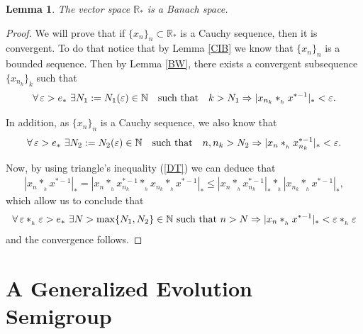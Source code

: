 \documentclass[10pt]{amsart}
\newtheorem{lemma}{Lemma}
\numberwithin{equation}{section}
\begin{document}
\begin{lemma}
The vector space $\mathbb{R}_*$ is a Banach space.
\end{lemma}

\begin{proof}
We will prove that if $\{x_{n}\}_{n}\subset \mathbb{R}_*$ is a Cauchy sequence, then it is convergent.
To do that notice that by Lemma \ref{CIB} we know that $\{x_{n}\}_{n}$ is a bounded sequence. Then by Lemma   
\ref{BW},  there exists a convergent
subsequence $\{x_{n_{k}}\}_{k}$ such that
\begin{equation*}
\forall \, \varepsilon >e_{\ast} \,\, \exists N_{1}:=N_{1}(\varepsilon)\in \mathbb{N} \quad\textnormal{such that} \quad
k>N_{1} \Rightarrow |x_{n_{k}}\ast_{_h} x^{\ast-1}|_{\ast}<\varepsilon.
\end{equation*}

In addition, as $\{x_{n}\}_{n}$ is a Cauchy sequence, we also know that
\begin{equation*}
\forall \, \varepsilon >e_{\ast} \,\, \exists N_{2}:=N_{2}(\varepsilon)\in \mathbb{N} \quad\textnormal{such that} \quad
n,n_{k}>N_{2} \Rightarrow |x_{n}\ast_{_h} x_{n_{k}}^{\ast-1}|_{\ast}<\varepsilon.
\end{equation*}

Now, by using triangle's inequality (\ref{DT}) we can deduce that
\begin{displaymath}
\begin{array}{l}
|x_{n}\ast_{_h} x^{\ast-1}|_{\ast} = |x_{n}\ast_{_h} x_{n_{k}}^{\ast-1}\ast_{_h}x_{n_{k}}\ast_{_h} x^{\ast-1}|_{\ast} 
\leq  |x_{n}\ast_{_h}x_{n_{k}}^{\ast-1}|_{\ast}\ast_{_h}|x_{n_{k}}\ast_{_h}x^{\ast-1}|_{\ast}, 
\end{array}    
\end{displaymath}
which allow us to conclude that
\begin{displaymath}
\forall \, \varepsilon \ast_{_h} \varepsilon >e_{\ast} \,\, \exists N>\max\{N_{1},N_{2}\}\in \mathbb{N} \ \textnormal{such that} \ 
n>N \Rightarrow |x_{n}\ast_{_h} x^{\ast-1}|_{\ast}<\varepsilon \ast_{_h} \varepsilon
\end{displaymath}
and the convergence follows.

\end{proof}

\section{A Generalized Evolution Semigroup}
\end{document}
